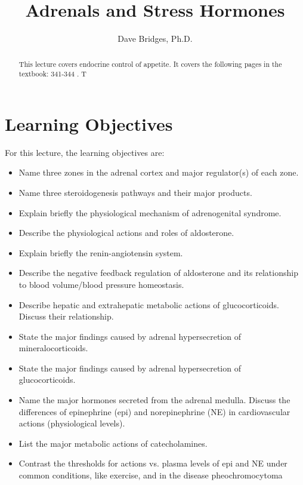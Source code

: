 \documentclass{tufte-handout}
\title{Adrenals and Stress Hormones}
\author{Dave Bridges, Ph.D.}
\begin{document}
\maketitle%

\begin{abstract}
\noindent This lecture covers endocrine control of appetite.  It covers the following pages in the textbook: 341-344 \cite{Widmaier2013}.  T
\end{abstract}

\tableofcontents

\pagebreak

\section{Learning Objectives}
For this lecture, the learning objectives are:
\begin{itemize}
\item Name three zones in the adrenal cortex and major regulator(s) of each zone.
\item Name three steroidogenesis pathways and their major products.
\item Explain briefly the physiological mechanism of adrenogenital syndrome.
\item Describe the physiological actions and roles of aldosterone.
\item Explain briefly the renin-angiotensin system.
\item Describe the negative feedback regulation of aldosterone and its relationship to blood volume/blood pressure homeostasis.
\item Describe hepatic and extrahepatic metabolic actions of glucocorticoids. Discuss their relationship.
\item State the major findings caused by adrenal hypersecretion of mineralocorticoids.
\item State the major findings caused by adrenal hypersecretion of glucocorticoids. 
\item Name the major hormones secreted from the adrenal medulla. Discuss the differences of epinephrine (epi) and norepinephrine (NE) in cardiovascular actions (physiological levels). 
\item List the major metabolic actions of catecholamines.
\item Contrast the thresholds for actions vs. plasma levels of epi and NE under common conditions, like exercise, and in the disease pheochromocytoma

\end{itemize}



\listoffigures
\listoftables



\end{document}
